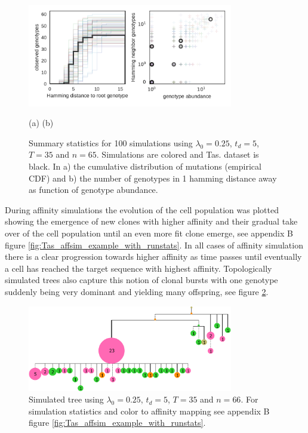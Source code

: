 \begin{figure}
    \begin{center}
    \includegraphics[width=0.8\textwidth]{figures/Tas-affsim_Tas-data.pdf}\newline%
    \end{center}
    \vspace{-14mm} \hspace{42mm} (a) \hspace{52mm} (b)
    \caption{
        \label{fig:Tas-affsim_Tas-data}
        Summary statistics for 100 simulations using $\lambda_0=0.25$, $t_d=5$, $T=35$ and $n=65$.
        Simulations are colored and Tas. dataset is black.
        In a) the cumulative distribution of mutations (empirical CDF) and b) the number of genotypes in 1 hamming distance away as function of genotype abundance.
    }
\end{figure}


During affinity simulations the evolution of the cell population was plotted showing the emergence of new clones with higher affinity and their gradual take over of the cell population until an even more fit clone emerge, see appendix B figure \ref{fig:Tas_affsim_example_with_runstats}.
In all cases of affinity simulation there is a clear progression towards higher affinity as time passes until eventually a cell has reached the target sequence with highest affinity.
Topologically simulated trees also capture this notion of clonal bursts with one genotype suddenly being very dominant and yielding many offspring, see figure \ref{fig:Tas_affsim_example.collapsed_runstat_color_tree}.

\begin{figure}
    \centering
    \includegraphics[width=0.8\textwidth]{figures/Tas_affsim_example_collapsed_runstat_color_tree.pdf}
    \caption{
        \label{fig:Tas_affsim_example.collapsed_runstat_color_tree}
        Simulated tree using $\lambda_0=0.25$, $t_d=5$, $T=35$ and $n=66$.
        For simulation statistics and color to affinity mapping see appendix B figure \ref{fig:Tas_affsim_example_with_runstats}.
    }
\end{figure}





